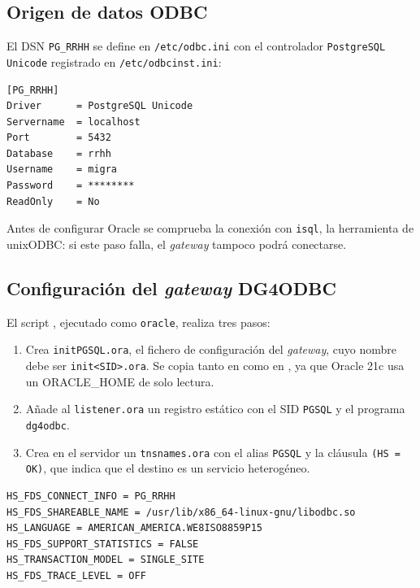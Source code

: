 \subsection{Origen de datos ODBC}

El DSN \texttt{PG\_RRHH} se define en \texttt{/etc/odbc.ini} con el controlador \texttt{PostgreSQL Unicode} registrado en \texttt{/etc/odbcinst.ini}:

\begin{lstlisting}
[PG_RRHH]
Driver      = PostgreSQL Unicode
Servername  = localhost
Port        = 5432
Database    = rrhh
Username    = migra
Password    = ********
ReadOnly    = No
\end{lstlisting}

Antes de configurar Oracle se comprueba la conexión con \texttt{isql}, la herramienta de unixODBC: si este paso falla, el \textit{gateway} tampoco podrá conectarse.


\subsection{Configuración del \textit{gateway} DG4ODBC}

El script , ejecutado como \texttt{oracle}, realiza tres pasos:

\begin{enumerate}
    \item Crea \texttt{initPGSQL.ora}, el fichero de configuración del \textit{gateway}, cuyo nombre debe ser \texttt{init<SID>.ora}. Se copia tanto en  como en , ya que Oracle 21c usa un ORACLE\_HOME de solo lectura.
    \item Añade al \texttt{listener.ora} un registro estático con el SID \texttt{PGSQL} y el programa \texttt{dg4odbc}.
    \item Crea en el servidor un \texttt{tnsnames.ora} con el alias \texttt{PGSQL} y la cláusula \texttt{(HS = OK)}, que indica que el destino es un servicio heterogéneo.
\end{enumerate}

\begin{lstlisting}[caption={\texttt{initPGSQL.ora} (versión final)}]
HS_FDS_CONNECT_INFO = PG_RRHH
HS_FDS_SHAREABLE_NAME = /usr/lib/x86_64-linux-gnu/libodbc.so
HS_LANGUAGE = AMERICAN_AMERICA.WE8ISO8859P15
HS_FDS_SUPPORT_STATISTICS = FALSE
HS_TRANSACTION_MODEL = SINGLE_SITE
HS_FDS_TRACE_LEVEL = OFF
\end{lstlisting}


